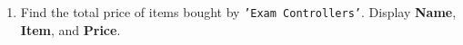 \documentclass[12pt,a4paper]{article}
\begin{document}
\begin{enumerate}


    \item Find the total price of items bought by \texttt{'Exam Controllers'}. Display \textbf{Name}, \textbf{Item}, and \textbf{Price}.





\end{enumerate}
\end{document}
